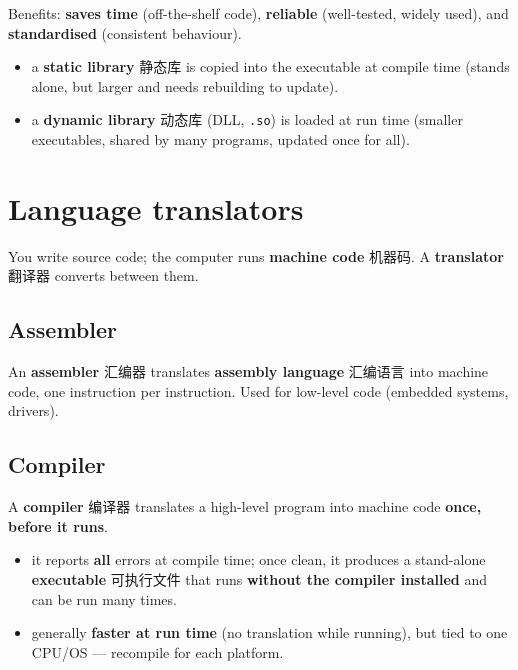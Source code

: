 \documentclass[11pt]{article}
\begin{document}
Benefits: \textbf{saves time} (off-the-shelf code), \textbf{reliable} (well-tested, widely used), and \textbf{standardised} (consistent behaviour).

\begin{itemize}
\item a \textbf{static library} 静态库 is copied into the executable at compile time (stands alone, but larger and needs rebuilding to update).

\item a \textbf{dynamic library} 动态库 (DLL, \texttt{.so}) is loaded at run time (smaller executables, shared by many programs, updated once for all).

\end{itemize}

\section*{Language translators}

You write source code; the computer runs \textbf{machine code} 机器码. A \textbf{translator} 翻译器 converts between them.

\subsection*{Assembler}

An \textbf{assembler} 汇编器 translates \textbf{assembly language} 汇编语言 into machine code, one instruction per instruction. Used for low-level code (embedded systems, drivers).

\subsection*{Compiler}

A \textbf{compiler} 编译器 translates a high-level program into machine code \textbf{once, before it runs}.

\begin{itemize}
\item it reports \textbf{all} errors at compile time; once clean, it produces a stand-alone \textbf{executable} 可执行文件 that runs \textbf{without the compiler installed} and can be run many times.

\item generally \textbf{faster at run time} (no translation while running), but tied to one CPU/OS — recompile for each platform.

\end{itemize}
\end{document}
